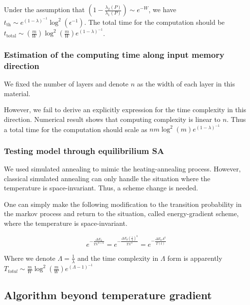 \documentclass[twocolumn,superscriptaddress,english,showpacs,longbibliography]{revtex4-2}
\begin{document}
Under the assumption that
$\left(1-\frac{\lambda_2(P)}{\lambda_1(P)}\right)\sim e^{-W}$, we have
$t_{\text{th}} \sim e^{(1-\lambda)^{-1}}\log^2(\epsilon^{-1})$. The
total time for the computation should be
$t_{\text{total}} \sim \left(\frac{m}{W}\right)\log^2(\frac{m}{W}) e^{(1-\lambda)^{-1}}$.

\subsubsection{Estimation of the computing time along input memory direction}\label{Estimation-of-the-computing-time-along-input-memory-direction}

We fixed the number of layers and denote $n$ as the width of each layer in this material.

However, we fail to derive an explicitly expression for the time complexity in this direction. 
Numerical result shows that computing complexity is linear to $n$. Thus a total time
for the computation should scale as $nm\log^2(m)e^{(1-\lambda)^{-1}}$ 

\subsubsection{Testing model through equilibrilium SA}\label{temperature-gradient-and-energy-gradient}

We used simulated annealing to mimic the heating-annealing process.
However, classical simulated annealing can only handle the situation
where the temperature is space-invariant. Thus, a scheme change is needed.

One can simply
make the following modification to the transition probability in the
markov process and return to the situation, called energy-gradient scheme, where the temperature is space-invariant.

\begin{equation}
e^{-\frac{\Delta E_k}{T\lambda^{ct+k}}} = e^{-\frac{\Delta E_k(\frac{1}{\lambda})^k}{T\lambda^{ct}}} = e^{-\frac{\Delta E_k \Lambda^k}{T(t)}}
\end{equation}

Where we denote $\Lambda = \frac{1}{\lambda}$ and the time complexity in $\Lambda$ form is apparently
$T_{total} \sim \frac{m}{W}\log^2(\frac{m}{W})e^{(\Lambda-1)^{-1}}$



\subsection{Algorithm beyond temperature
gradient}\label{algorithm-beyond-temperature-gradient}
\end{document}
